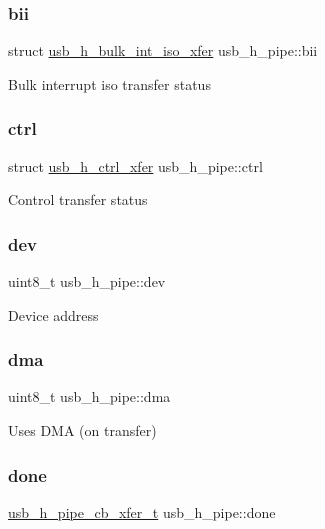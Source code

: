 \subsubsection{\texorpdfstring{bii}{bii}}
{\footnotesize\ttfamily struct \hyperlink{structusb__h__bulk__int__iso__xfer}{usb\+\_\+h\+\_\+bulk\+\_\+int\+\_\+iso\+\_\+xfer} usb\+\_\+h\+\_\+pipe\+::bii}

Bulk interrupt iso transfer status \mbox{\label{structusb__h__pipe_abd949448cab8f10054ebcb0f1dedfaf4}} 
\subsubsection{\texorpdfstring{ctrl}{ctrl}}
{\footnotesize\ttfamily struct \hyperlink{structusb__h__ctrl__xfer}{usb\+\_\+h\+\_\+ctrl\+\_\+xfer} usb\+\_\+h\+\_\+pipe\+::ctrl}

Control transfer status \mbox{\label{structusb__h__pipe_aabe6cb3a96961c2b5850a73c5bdfa8ca}} 
\subsubsection{\texorpdfstring{dev}{dev}}
{\footnotesize\ttfamily uint8\+\_\+t usb\+\_\+h\+\_\+pipe\+::dev}

Device address \mbox{\label{structusb__h__pipe_aea4a85a3cbdcd530de56537deeabb243}} 
\subsubsection{\texorpdfstring{dma}{dma}}
{\footnotesize\ttfamily uint8\+\_\+t usb\+\_\+h\+\_\+pipe\+::dma}

Uses D\+MA (on transfer) \mbox{\label{structusb__h__pipe_a42317c503317014d61b8773209f18ce7}} 
\subsubsection{\texorpdfstring{done}{done}}
{\footnotesize\ttfamily \hyperlink{hpl__usb__host_8h_a8797518a47a3477b6a65ed5358155078}{usb\+\_\+h\+\_\+pipe\+\_\+cb\+\_\+xfer\+\_\+t} usb\+\_\+h\+\_\+pipe\+::done}

